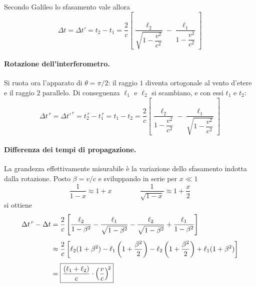 Secondo Galileo lo sfasamento vale allora
\begin{equation}
    \Delta t = \Delta t' = t_2 - t_1 = \frac{2}{c}
    \left[ \frac{\ell_2}{\sqrt{1 - \dfrac{v^2}{c^2}}} - \frac{\ell_1}{1 - \dfrac{v^2}{c^2}} \right]
\end{equation}

\paragraph{Rotazione dell'interferometro.}
Si ruota ora l'apparato di $\theta = \pi/2$: il raggio $1$ diventa ortogonale al vento d'etere e il raggio $2$ parallelo. Di conseguenza $\ell_1$ e $\ell_2$ si scambiano, e con essi $t_1$ e $t_2$:
\begin{equation}
    \Delta t^{\,r} = \Delta t'^{\,r} = t_2^{\,r} - t_1^{\,r} = t_1 - t_2 = \frac{2}{c}
    \left[ \frac{\ell_2}{1 - \dfrac{v^2}{c^2}} - \frac{\ell_1}{\sqrt{1 - \dfrac{v^2}{c^2}}} \right]
\end{equation}

\paragraph{Differenza dei tempi di propagazione.}
La grandezza effettivamente misurabile è la variazione dello sfasamento indotta dalla rotazione. Posto $\beta = v/c$ e sviluppando in serie per $x \ll 1$
\begin{equation*}
    \frac{1}{1-x} \approx 1 + x
    \qquad\qquad
    \frac{1}{\sqrt{1-x}} \approx 1 + \frac{x}{2}
\end{equation*}
si ottiene
\begin{align}
    \Delta t^{\,r} - \Delta t
    &= \frac{2}{c} \left[ \frac{\ell_2}{1-\beta^2} - \frac{\ell_1}{\sqrt{1-\beta^2}}
       - \frac{\ell_2}{\sqrt{1-\beta^2}} + \frac{\ell_1}{1-\beta^2} \right] \notag \\[4pt]
    &\approx \frac{2}{c} \left[ \ell_2(1+\beta^2) - \ell_1\left(1+\frac{\beta^2}{2}\right)
       - \ell_2\left(1+\frac{\beta^2}{2}\right) + \ell_1(1+\beta^2) \right] \notag \\[4pt]
    &= \boxed{\frac{(\ell_1 + \ell_2)}{c} \cdot \left(\frac{v}{c}\right)^{\!2}}
\end{align}


